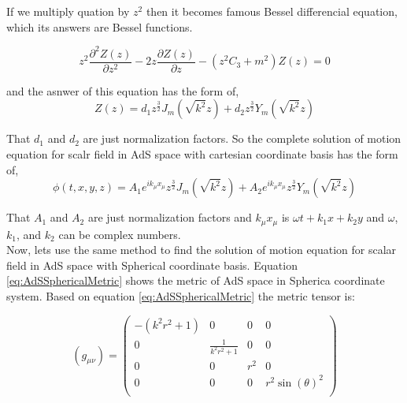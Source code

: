 If we multiply quation \label{eq:3thtermAdSI} by $z^2$ then it becomes famous Bessel differencial equation, which its answers are Bessel functions.

\begin{equation} \label{eq:3thtermAdSII}
    z^2 \frac{\partial^2Z(z)}{\partial z^2} - 2 z\frac{\partial Z(z)}{\partial z} - (z^2 C_3 + m^2)Z(z) = 0 
\end{equation}

and the asnwer of this equation has the form of,\\

\begin{equation}
    Z(z) = d_1 z^{\frac{3}{2}} J_{m}(\sqrt{k^2} z) + d_2 z^{\frac{3}{2}} Y_{m}(\sqrt{k^2} z)
\end{equation}

That $d_1$ and $d_2$ are just normalization factors. So the complete solution of motion equation for scalr field in AdS space with cartesian coordinate basis has the form of, \\

\begin{equation}
    \phi(t,x,y,z) = A_1 e^{ik_\mu x_\mu} z^{\frac{3}{2}} J_{m}(\sqrt{k^2} z) + A_2 e^{ik_\mu x_\mu} z^{\frac{3}{2}} Y_{m}(\sqrt{k^2} z)
\end{equation}

That $A_1$ and $A_2$ are just normalization factors and $k_\mu x_\mu$ is $\omega t + k_1 x + k_2 y$ and $\omega$, $k_1$, and $k_2$ can be complex numbers.\\

Now, lets use the same method to find the solution of motion equation for scalar field in AdS space with Spherical coordinate basis. Equation \ref{eq:AdSSphericalMetric} shows the metric of AdS space in Spherica coordinate system. Based on equation \ref{eq:AdSSphericalMetric} the metric tensor is:

\begin{equation} \label{eq:AdSSphericalMetricTensor}
    (g_{\mu\nu}) = 
    \begin{pmatrix}
        -\left( k^2r^2 + 1\right) & 0 & 0 & 0 \\
        0 & \frac{1}{k^2r^2+1} & 0 & 0 \\
        0 & 0 & r^2 & 0 \\
        0 & 0 & 0 & r^2 \sin{(\theta)}^2 \\
    \end{pmatrix}
\end{equation}

